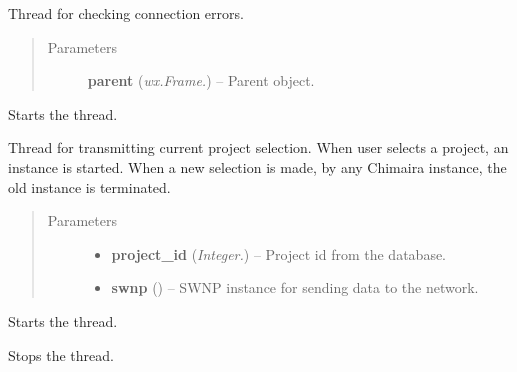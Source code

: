 \documentclass[letterpaper,10pt,english]{sphinxmanual}
\begin{document}

\begin{fulllineitems}
\label{api:wos.CONN_ERR_TH}
Thread for checking connection errors.
\begin{quote}\begin{description}
\item[{Parameters}] \leavevmode
\textbf{parent} (\emph{wx.Frame.}) -- Parent object.

\end{description}\end{quote}

\begin{fulllineitems}
\label{api:wos.CONN_ERR_TH.run}
Starts the thread.

\end{fulllineitems}


\end{fulllineitems}


\begin{fulllineitems}
\label{api:wos.CURRENT_PROJECT}
Thread for transmitting current project selection.
When user selects a project, an instance is started.
When a new selection is made, by any Chimaira instance,
the old instance is terminated.
\begin{quote}\begin{description}
\item[{Parameters}] \leavevmode\begin{itemize}
\item {} 
\textbf{project\_id} (\emph{Integer.}) -- Project id from the database.

\item {} 
\textbf{swnp} ({\hyperref[api:swnp.SWNP]{}}) -- SWNP instance for sending data to the network.

\end{itemize}

\end{description}\end{quote}

\begin{fulllineitems}
\label{api:wos.CURRENT_PROJECT.run}
Starts the thread.

\end{fulllineitems}


\begin{fulllineitems}
\label{api:wos.CURRENT_PROJECT.stop}
Stops the thread.

\end{fulllineitems}


\end{fulllineitems}
\end{document}
